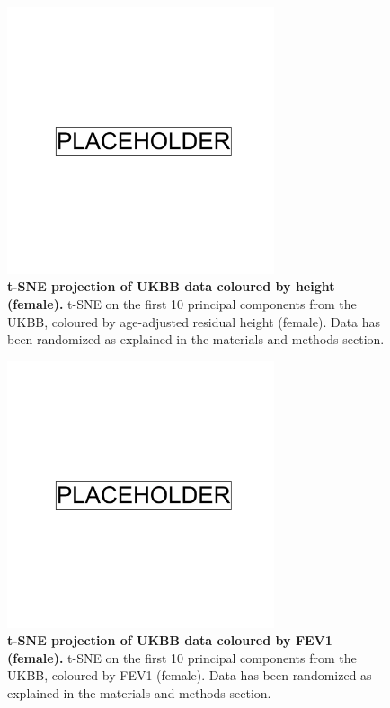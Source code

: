 \clearpage
\begin{figure}
    \centering
    \includegraphics[width=0.7\textwidth]{placeholder.png}
    \caption[t-SNE projection of UKBB data coloured by height (female)]{\textbf{t-SNE projection of UKBB data coloured by height (female).} t-SNE on the first 10 principal components from the UKBB, coloured by age-adjusted residual height (female). Data has been randomized as explained in the materials and methods section.}
    \label{fig:supp_ukbb_tsne_height_res_f}
\end{figure}

\newpage

\begin{figure}
    \centering
    \includegraphics[width=0.7\textwidth]{placeholder.png}
    \caption[t-SNE projection of UKBB data coloured by FEV1 (female)]{\textbf{t-SNE projection of UKBB data coloured by FEV1 (female).} t-SNE on the first 10 principal components from the UKBB, coloured by FEV1 (female). Data has been randomized as explained in the materials and methods section.}
    \label{fig:supp_ukbb_tsne_fev_f}
\end{figure}


